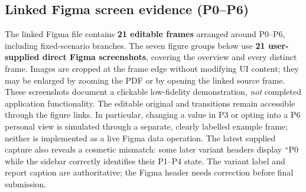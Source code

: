 \documentclass[12pt,a4paper]{article}
\begin{document}
\subsection{Linked Figma screen evidence (P0--P6)}
The linked Figma file contains \textbf{21 editable frames} arranged around P0--P6, including fixed-scenario branches. The seven figure groups below use \textbf{21 user-supplied direct Figma screenshots}, covering the overview and every distinct frame. Images are cropped at the frame edge without modifying UI content; they may be enlarged by zooming the PDF or by opening the linked source frame. These screenshots document a clickable low-fidelity demonstration, \emph{not} completed application functionality. The editable original and transitions remain accessible through the figure links.
In particular, changing a value in P3 or opting into a P6 personal view is simulated through a separate, clearly labelled example frame; neither is implemented as a live Figma data operation. The latest supplied capture also reveals a cosmetic mismatch: some later variant headers display ``P0 while the sidebar correctly identifies their P1--P4 state. The variant label and report caption are authoritative; the Figma header needs correction before final submission.
\end{document}
